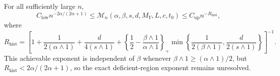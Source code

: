 For all sufficiently large \(n\),
\[
C_{\mathrm{low}}n^{-2\alpha/(2\alpha+1)}
\le\mathcal M_n(\alpha,\beta,s,d,M_Y,L,c,t_0)
\le C_{\mathrm{up}}n^{-R_{\mathrm{hist}}},
\]
where
\[
R_{\mathrm{hist}}=\left[1+\frac{1}{2(\alpha\wedge1)}+\frac{d}{4(s\wedge1)}+\left\{\frac12-\frac{\beta\wedge1}{\alpha\wedge1}\right\}_+\min\left\{\frac{1}{2(\beta\wedge1)},\frac{d}{2(s\wedge1)}\right\}\right]^{-1}.
\]
This achievable exponent is independent of \(\beta\) whenever \(\beta\wedge1\ge(\alpha\wedge1)/2\), but \(R_{\mathrm{hist}}<2\alpha/(2\alpha+1)\), so the exact deficient-region exponent remains unresolved.